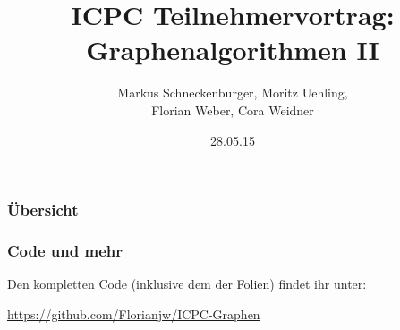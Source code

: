 \documentclass{beamer}
\title[Graphen II]{ICPC Teilnehmervortrag: Graphenalgorithmen II} %
\author{Markus Schneckenburger, Moritz Uehling,\\Florian Weber, Cora Weidner } %
\institute[UCLA] %
{
	KIT\\ICPC-Teilnehmervortrag
}
\date{28.05.15} %
\begin{document}
\begin{frame}
\titlepage %
\end{frame}

\begin{frame}
\frametitle{Übersicht} 
\tableofcontents
\end{frame}

\begin{frame}
\frametitle{Code und mehr} 
Den kompletten Code (inklusive dem der Folien) findet ihr unter: 

\url{https://github.com/Florianjw/ICPC-Graphen}

\end{frame}


%





\end{document}
